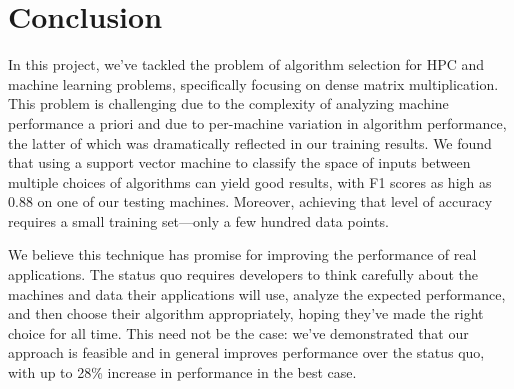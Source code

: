 \section{Conclusion}
\label{s:conclusion}
In this project, we've tackled the problem of algorithm selection for HPC and machine learning problems, specifically focusing on dense matrix multiplication.
This problem is challenging due to the complexity of analyzing machine performance a priori and due to per-machine variation in algorithm performance, the latter of which was dramatically reflected in our training results.
We found that using a support vector machine to classify the space of inputs between multiple choices of algorithms can yield good results, with F1 scores as high as 0.88 on one of our testing machines.
Moreover, achieving that level of accuracy requires a small training set---only a few hundred data points.

We believe this technique has promise for improving the performance of real applications.
The status quo requires developers to think carefully about the machines and data their applications will use, analyze the expected performance, and then choose their algorithm appropriately, hoping they've made the right choice for all time.
This need not be the case: we've demonstrated that our approach is feasible and in general improves performance over the status quo, with up to 28\% increase in performance in the best case.
